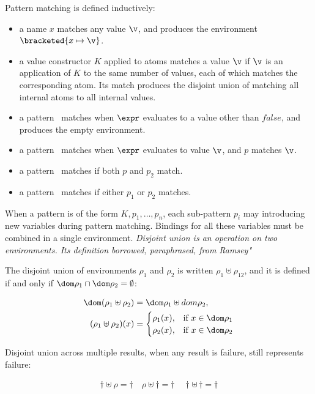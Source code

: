 \documentclass[manuscript,screen,review, 12pt, nonacm]{acmart}
\begin{document}
Pattern matching is defined inductively: 
\begin{itemize}
    \item a name $x$ matches any value $\v$, and produces the environment 
    $\bracketed{x \mapsto \v}$. 
    \item a value constructor $K$ applied to atoms  matches 
    a value $\v$ if $\v$ is an application of $K$ to the same number of values,
    each of which matches the corresponding atom. Its match produces 
    the disjoint union of matching all internal atoms to all internal values. 
    \item a pattern \whenexpr\ matches when $\expr$ evaluates to a value other than 
    $\mathit{false}$, and produces the empty environment. 
    \item a pattern \parrowe\ matches when $\expr$ evaluates to 
          value $\v$, and $p$ matches $\v$. 
    \item a pattern \pcommap\ matches if both $p$ and $p_{2}$ match.
    \item a pattern \porp\ matches if either $p_{1}$ or $p_{2}$
    matches. 
\end{itemize}

When a pattern is of the form $K, p_{1}, \dots, p_{n}$, each sub-pattern $p_{i}$
may introducing new variables during pattern matching. Bindings for all these
variables must be combined in a single environment. \it{Disjoint union} is an
operation on two environments. Its definition borrowed, paraphrased, from Ramsey\cite{bpc}" 

The disjoint union of environments $\rho_{1}$ and $\rho_{2}$ is written
$\rho_{1} \uplus \rho_{12}$, and it is defined if and only if $\dom \rho_{1}
\cap \dom \rho_{2} = \emptyset$:

\begin{align*}
  \dom(\rho_{1} \uplus \rho_{2}) &= \dom \rho_{1} \uplus dom \rho_{2}, \\
    (\rho_{1} \uplus \rho_{2})(x) &= 
  \begin{cases}
    \rho_{1}(x), & \text{if } x \in \dom  \rho_{1} \\
    \rho_{2}(x), & \text{if } x \in \dom \rho_{2} \\
\end{cases}
\end{align*}

Disjoint union across multiple results, when any result is failure, still
represents failure: 

\begin{gather*}
  \dagger \uplus \rho = \dagger \quad
  \rho \uplus \dagger = \dagger \quad
  \dagger \uplus\, \dagger = \dagger
\end{gather*}
\end{document}
